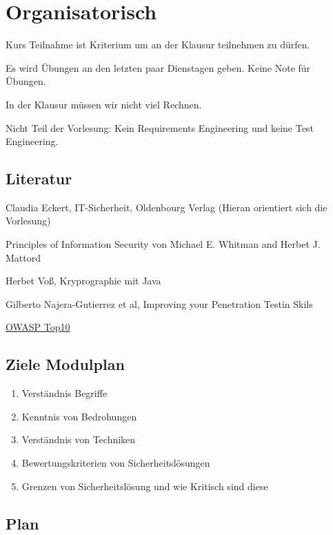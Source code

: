 \documentclass[a4paper]{article}
\title{\docTitle}
\author{Moritz}
\date{\today}
\begin{document}
\maketitle
\tableofcontents


\section{Organisatorisch}

Kurs Teilnahme ist Kriterium um an der Klausur teilnehmen zu dürfen.

Es wird Übungen an den letzten paar Dienstagen geben. Keine Note für Übungen.

In der Klausur müssen wir nicht viel Rechnen.

Nicht Teil der Vorlesung: Kein Requirements Engineering und keine Test Engineering.

\subsection{Literatur}

Claudia Eckert, IT-Sicherheit, Oldenbourg Verlag (Hieran orientiert sich die Vorlesung)

Principles of Information Security von Michael E. Whitman and Herbet J. Mattord

Herbet Voß, Kryprographie mit Java

Gilberto Najera-Gutierrez et al, Improving your Penetration Testin Skils

\href{https:\\www.owasp.de\top10}{OWASP Top10}

\subsection{Ziele Modulplan}

\begin{enumerate}
    \item Verständnis Begriffe
    \item Kenntnis von Bedrohungen
    \item Verständnis von Techniken
    \item Bewertungskriterien von Sicherheitslösungen
    \item Grenzen von Sicherheitslösung und wie Kritisch sind diese
\end{enumerate}

\subsection{Plan}
\end{document}
